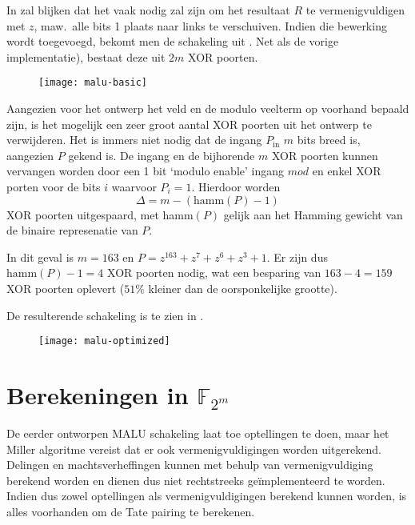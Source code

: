 In  zal blijken dat het vaak nodig zal zijn om het resultaat $R$ te vermenigvuldigen met $z$, maw.\ alle bits 1 plaats naar links te verschuiven. Indien die bewerking wordt toegevoegd, bekomt men de schakeling uit . Net als de vorige implementatie), bestaat deze uit $2m$ XOR poorten.

\begin{figure}[h]
	\begin{center}
		\texttt{[image: malu-basic]}
		\label{figuur-implementatie-malu-basic}
	\end{center}
\end{figure}

Aangezien voor het ontwerp het veld en de modulo veelterm op voorhand bepaald zijn, is het mogelijk een zeer groot aantal XOR poorten uit het ontwerp te verwijderen. Het is immers niet nodig dat de ingang $P_{\text{in}}$ $m$ bits breed is, aangezien $P$ gekend is. De ingang en de bijhorende $m$ XOR poorten kunnen vervangen worden door een 1 bit `modulo enable' ingang $mod$ en enkel XOR porten voor de bits $i$ waarvoor $P_i = 1$. Hierdoor worden 
\[\Delta = m - (\text{hamm}(P) - 1)\]
XOR poorten uitgespaard, met hamm$(P)$ gelijk aan het Hamming gewicht van de binaire represenatie van $P$.

In dit geval is $m = 163$ en $P = z^{163} + z^7 + z^6 + z^3 + 1$. Er zijn dus $\text{hamm}(P) - 1 = 4$ XOR poorten nodig, wat een besparing van $163 - 4 =  159$ XOR poorten oplevert ($51\%$ kleiner dan de oorsponkelijke grootte).

De resulterende schakeling is te zien in .

\begin{figure}[h]
	\begin{center}
		\texttt{[image: malu-optimized]}
		\label{figuur-implementatie-malu-optimized}
	\end{center}
\end{figure}

\section{Berekeningen in $\mathbb{F}_{2^m}$}\label{sectie-implementatie-gf2m}

De eerder ontworpen MALU schakeling laat toe optellingen te doen, maar het Miller algoritme vereist dat er ook vermenigvuldigingen worden uitgerekend. Delingen en machtsverheffingen kunnen met behulp van vermenigvuldiging berekend worden en dienen dus niet rechtstreeks ge\"implementeerd te worden. Indien dus zowel optellingen als vermenigvuldigingen berekend kunnen worden, is alles voorhanden om de Tate pairing te berekenen.

